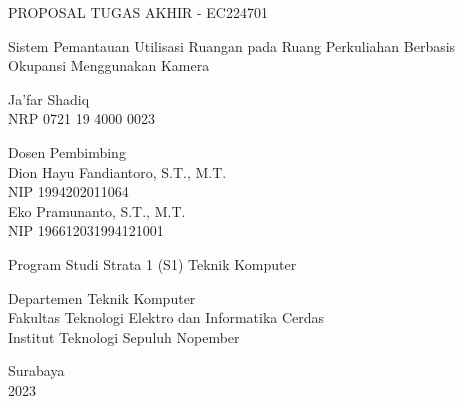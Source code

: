 \begin{large}
  PROPOSAL TUGAS AKHIR - EC224701
\end{large}

\vspace{\fill}

\begin{spacing}{1.5}
  \begin{Large}
    Sistem Pemantauan Utilisasi Ruangan 
    pada Ruang Perkuliahan Berbasis Okupansi Menggunakan Kamera
  \end{Large}
\end{spacing}

\vspace{\fill}

\begin{large}
  Ja'far Shadiq \\
  \textmd{NRP 0721 19 4000 0023}
\end{large}

\vspace{\fill}

\begin{large}
  \textmd{Dosen Pembimbing} \\
  Dion Hayu Fandiantoro, S.T., M.T. \\
  \textmd{NIP 1994202011064} \\
  Eko Pramunanto, S.T., M.T. \\
  \textmd{NIP 196612031994121001} \\

\end{large}

\vspace{\fill}

Program Studi Strata 1 (S1) Teknik Komputer \\

\mdseries

Departemen Teknik Komputer \\
Fakultas Teknologi Elektro dan Informatika Cerdas \\
Institut Teknologi Sepuluh Nopember

Surabaya \\
2023

